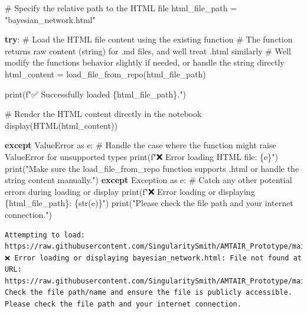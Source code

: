 \documentclass[
  11pt,
  letterpaper,
]{book}
\newenvironment{Shaded}{\begin{snugshade}}{\end{snugshade}}
\newcommand{\BuiltInTok}[1]{\textcolor[rgb]{0.00,0.23,0.31}{#1}}
\newcommand{\CommentTok}[1]{\textcolor[rgb]{0.37,0.37,0.37}{#1}}
\newcommand{\ControlFlowTok}[1]{\textcolor[rgb]{0.00,0.23,0.31}{\textbf{#1}}}
\newcommand{\ImportTok}[1]{\textcolor[rgb]{0.00,0.46,0.62}{#1}}
\newcommand{\NormalTok}[1]{\textcolor[rgb]{0.00,0.23,0.31}{#1}}
\newcommand{\OperatorTok}[1]{\textcolor[rgb]{0.37,0.37,0.37}{#1}}
\newcommand{\PreprocessorTok}[1]{\textcolor[rgb]{0.68,0.00,0.00}{#1}}
\newcommand{\SpecialCharTok}[1]{\textcolor[rgb]{0.37,0.37,0.37}{#1}}
\newcommand{\SpecialStringTok}[1]{\textcolor[rgb]{0.13,0.47,0.30}{#1}}
\newcommand{\StringTok}[1]{\textcolor[rgb]{0.13,0.47,0.30}{#1}}
\begin{document}
\begin{Shaded}
\begin{Highlighting}[]
\CommentTok{\# Specify the relative path to the HTML file}
\NormalTok{html\_file\_path }\OperatorTok{=} \StringTok{"bayesian\_network.html"}

\ControlFlowTok{try}\NormalTok{:}
    \CommentTok{\# Load the HTML file content using the existing function}
    \CommentTok{\# The function returns raw content (string) for .md files, and we\textquotesingle{}ll treat .html similarly}
    \CommentTok{\# We\textquotesingle{}ll modify the function\textquotesingle{}s behavior slightly if needed, or handle the string directly}
\NormalTok{    html\_content }\OperatorTok{=}\NormalTok{ load\_file\_from\_repo(html\_file\_path)}

    \BuiltInTok{print}\NormalTok{(}\SpecialStringTok{f"✅ Successfully loaded }\SpecialCharTok{\{}\NormalTok{html\_file\_path}\SpecialCharTok{\}}\SpecialStringTok{."}\NormalTok{)}

    \CommentTok{\# Render the HTML content directly in the notebook}
\NormalTok{    display(HTML(html\_content))}

\ControlFlowTok{except} \PreprocessorTok{ValueError} \ImportTok{as}\NormalTok{ e:}
    \CommentTok{\# Handle the case where the function might raise ValueError for unsupported types}
    \BuiltInTok{print}\NormalTok{(}\SpecialStringTok{f"❌ Error loading HTML file: }\SpecialCharTok{\{}\NormalTok{e}\SpecialCharTok{\}}\SpecialStringTok{"}\NormalTok{)}
    \BuiltInTok{print}\NormalTok{(}\StringTok{"Make sure the load\_file\_from\_repo function supports .html or handle the string content manually."}\NormalTok{)}
\ControlFlowTok{except} \PreprocessorTok{Exception} \ImportTok{as}\NormalTok{ e:}
    \CommentTok{\# Catch any other potential errors during loading or display}
    \BuiltInTok{print}\NormalTok{(}\SpecialStringTok{f"❌ Error loading or displaying }\SpecialCharTok{\{}\NormalTok{html\_file\_path}\SpecialCharTok{\}}\SpecialStringTok{: }\SpecialCharTok{\{}\BuiltInTok{str}\NormalTok{(e)}\SpecialCharTok{\}}\SpecialStringTok{"}\NormalTok{)}
    \BuiltInTok{print}\NormalTok{(}\StringTok{"Please check the file path and your internet connection."}\NormalTok{)}
\end{Highlighting}
\end{Shaded}

\begin{verbatim}
Attempting to load: https://raw.githubusercontent.com/SingularitySmith/AMTAIR_Prototype/main/data/example_carlsmith/bayesian_network.html
❌ Error loading or displaying bayesian_network.html: File not found at URL: https://raw.githubusercontent.com/SingularitySmith/AMTAIR_Prototype/main/data/example_carlsmith/bayesian_network.html. Check the file path/name and ensure the file is publicly accessible.
Please check the file path and your internet connection.
\end{verbatim}
\end{document}

